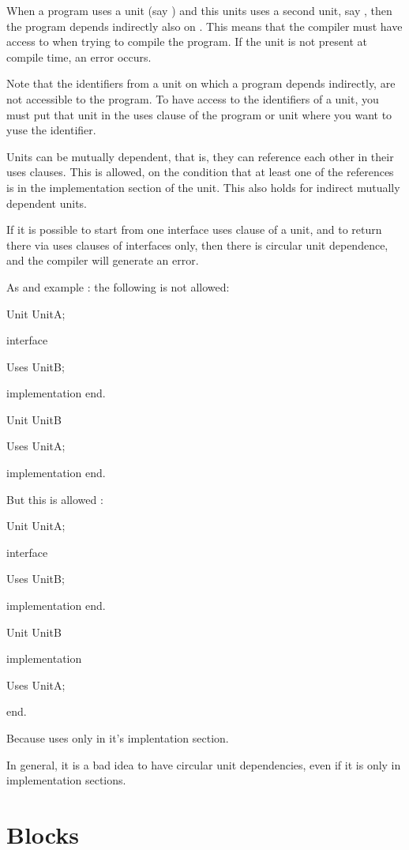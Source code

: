 \documentclass{report}
\begin{document}
When a program uses a unit (say ) and this units uses a second
unit, say , then the program depends indirectly also on
. This means that the compiler must have access to  when
trying to compile the program. If the unit is not present at compile time,
an error occurs.

Note that the identifiers from a unit on which a program depends indirectly,
are not accessible to the program. To have access to the identifiers of a
unit, you must put that unit in the uses clause of the program or unit where
you want to yuse the identifier.

Units can be mutually dependent, that is, they can reference each other in
their uses clauses. This is allowed, on the condition that at least one of
the references is in the implementation section of the unit. This also holds
for indirect mutually dependent units. 

If it is possible to start from one interface uses clause of a unit, and to return
there via uses clauses of interfaces only, then there is circular unit
dependence, and the compiler will generate an error.

As and example : the following is not allowed:
\begin{listing}
Unit UnitA;

interface

Uses UnitB;

implementation
end.

Unit UnitB

Uses UnitA;

implementation 
end.
\end{listing}
But this is allowed :
\begin{listing}
Unit UnitA;

interface

Uses UnitB;

implementation
end.

Unit UnitB

implementation 

Uses UnitA;

end.
\end{listing}
Because  uses  only in it's implentation section.

In general, it is a bad idea to have circular unit dependencies, even if it is
only in implementation sections.

\section{Blocks}
\end{document}
